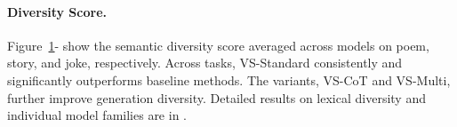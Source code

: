 \begin{figure}[t]
{  %
  \vspace{-3em}
   }
    \label{fig:creativity_main}
\end{figure}


\paragraph{Diversity Score.} Figure~\ref{fig:creativity_main}- show the semantic diversity score averaged across models on poem, story, and joke, respectively. %
Across tasks, VS-Standard consistently and significantly outperforms baseline methods. The variants, VS-CoT and VS-Multi, further improve generation diversity. Detailed results on lexical diversity and individual model families are in .

